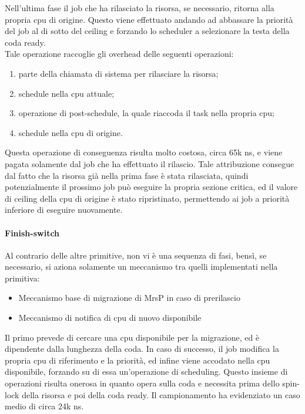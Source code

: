 \noindent Nell'ultima fase il job che ha rilasciato la risorsa, se necessario, ritorna alla propria cpu di origine. Questo viene effettuato andando ad abbassare la priorità del job al di sotto del ceiling e forzando lo scheduler a selezionare la testa della coda ready.\\

\noindent Tale operazione raccoglie gli overhead delle seguenti operazioni:

\begin{enumerate}
	\item parte della chiamata di sistema per rilasciare la risorsa;
	\item schedule nella cpu attuale;
	\item operazione di post-schedule, la quale riaccoda il task nella propria cpu;
	\item schedule nella cpu di origine.
\end{enumerate}

\noindent Questa operazione di conseguenza risulta molto costosa, circa 65k ns, e viene pagata solamente dal job che ha effettuato il rilascio. Tale attribuzione consegue dal fatto che la risorsa già nella prima fase è stata rilasciata, quindi potenzialmente il prossimo job può eseguire la propria sezione critica, ed il valore di ceiling della cpu di origine è stato ripristinato, permettendo ai job a priorità inferiore di eseguire nuovamente.

\paragraph{Finish-switch} Al contrario delle altre primitive, non vi è una sequenza di fasi, bensì, se necessario, si aziona solamente un meccanismo tra quelli implementati nella primitiva:

\begin{itemize}
	\item Meccanismo base di migrazione di MrsP in caso di prerilascio
	\item Meccanismo di notifica di cpu di nuovo disponibile
\end{itemize}

\noindent Il primo prevede di cercare una cpu disponibile per la migrazione, ed è dipendente dalla lunghezza della coda. In caso di successo, il job modifica la propria cpu di riferimento e la priorità, ed infine viene accodato nella cpu disponibile, forzando su di essa un'operazione di scheduling. Questo insieme di operazioni risulta onerosa in quanto opera sulla coda e necessita prima dello spin-lock della risorsa e poi della coda ready. Il campionamento ha evidenziato un caso medio di circa 24k ns.\\

